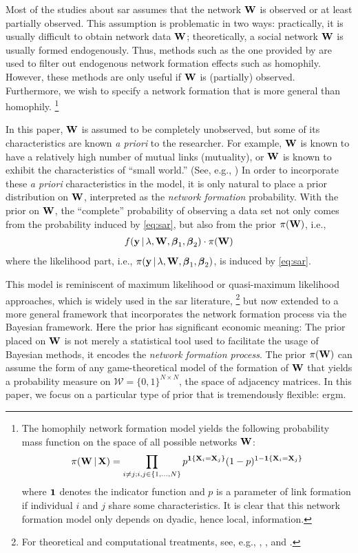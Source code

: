 \documentclass[a4paper]{article}
\begin{document}
Most of the studies about \gls{sar} assumes that the network $\mathbf{W}$ is observed or at least partially observed.
This assumption is problematic in two ways:
practically, it is usually difficult to obtain network data $\mathbf{W}$;
theoretically, a social network $\mathbf{W}$ is usually formed endogenously.
Thus, methods such as the one provided by \cite{goldsmith-pinkham-imbens-2013}
are used to filter out endogenous network formation effects such as homophily.
However, these methods are only useful if $\mathbf{W}$ is (partially) observed.
Furthermore, we wish to specify a network formation that is more general than homophily.
\footnote{
	The homophily network formation model yields the following probability mass function
	on the space of all possible networks $\mathbf{W}$:
	\begin{align*}
		\pi(\mathbf{W}\,|\,\mathbf{X}) = \prod_{i\neq j;i,j\in\{1,...,N\}} p^{\boldsymbol{1}\{\mathbf{X}_i=\mathbf{X}_j\}}(1-p)^{1-\boldsymbol{1}\{\mathbf{X}_i=\mathbf{X}_j\}}
	\end{align*}
	where $\boldsymbol{1}$ denotes the indicator function and $p$ is a parameter of link formation if individual $i$ and $j$ share some characteristics.
	It is clear that this network formation model only depends on dyadic, hence local, information.
}

In this paper, $\mathbf{W}$ is assumed to be completely unobserved,
but some of its characteristics are known \emph{a priori} to the researcher.
For example,
$\mathbf{W}$ is known to have a relatively high number of mutual links (mutuality),
or $\mathbf{W}$ is known to exhibit the characteristics of ``small world.'' (See, e.g., \cite{watts-strogatz-1998})
In order to incorporate these \emph{a priori} characteristics in the model,
it is only natural to place a prior distribution on $\mathbf{W}$, interpreted as the \emph{network formation} probability.
With the prior on $\mathbf{W}$,
the ``complete'' probability of observing a data set not only comes from the probability induced by \eqref{eq:sar},
but also from the prior $\pi(\mathbf{W})$, i.e.,
\begin{align*}
	f(\mathbf{y}\,|\,\lambda,\mathbf{W},\boldsymbol{\beta}_1,\boldsymbol{\beta}_2)\cdot\pi(\mathbf{W})
\end{align*}
where the likelihood part, i.e., $\pi(\mathbf{y}\,|\,\lambda,\mathbf{W},\boldsymbol{\beta}_1,\boldsymbol{\beta}_2)$, is induced by \eqref{eq:sar}.

This model is reminiscent of maximum likelihood or quasi-maximum likelihood approaches,
which is widely used in the \gls{sar} literature,
\footnote{
	For theoretical and computational treatments,
	see, e.g., \cite{ord-1975}, \cite{smirnov-anselin-2001}, and \cite{lee-2004}.
}
but now extended to a more general framework
that incorporates the network formation process via the Bayesian framework.
Here the prior has significant economic meaning:
The prior placed on $\mathbf{W}$ is not merely a statistical tool used to facilitate the usage of Bayesian methods,
it encodes the \emph{network formation process}.
The prior $\pi(\mathbf{W})$ can assume the form of any game-theoretical model of the formation of $\mathbf{W}$
that yields a probability measure on $\mathcal{W}=\{0,1\}^{N\times N}$, the space of adjacency matrices.
In this paper, we focus on a particular type of prior that is tremendously flexible: \gls{ergm}.
\end{document}
